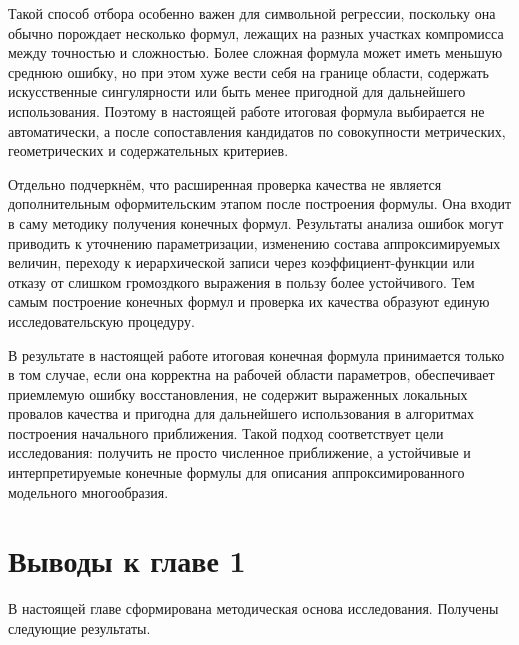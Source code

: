 Такой способ отбора особенно важен для символьной регрессии, поскольку она обычно порождает несколько формул, лежащих на разных участках компромисса между точностью и сложностью. Более сложная формула может иметь меньшую среднюю ошибку, но при этом хуже вести себя на границе области, содержать искусственные сингулярности или быть менее пригодной для дальнейшего использования. Поэтому в настоящей работе итоговая формула выбирается не автоматически, а после сопоставления кандидатов по совокупности метрических, геометрических и содержательных критериев.

Отдельно подчеркнём, что расширенная проверка качества не является дополнительным оформительским этапом после построения формулы. Она входит в саму методику получения конечных формул. Результаты анализа ошибок могут приводить к уточнению параметризации, изменению состава аппроксимируемых величин, переходу к иерархической записи через коэффициент-функции или отказу от слишком громоздкого выражения в пользу более устойчивого. Тем самым построение конечных формул и проверка их качества образуют единую исследовательскую процедуру.

В результате в настоящей работе итоговая конечная формула принимается только в том случае, если она корректна на рабочей области параметров, обеспечивает приемлемую ошибку восстановления, не содержит выраженных локальных провалов качества и пригодна для дальнейшего использования в алгоритмах построения начального приближения. Такой подход соответствует цели исследования: получить не просто численное приближение, а устойчивые и интерпретируемые конечные формулы для описания аппроксимированного модельного многообразия.

\section{Выводы к главе 1}

В настоящей главе сформирована методическая основа исследования. Получены следующие результаты.

